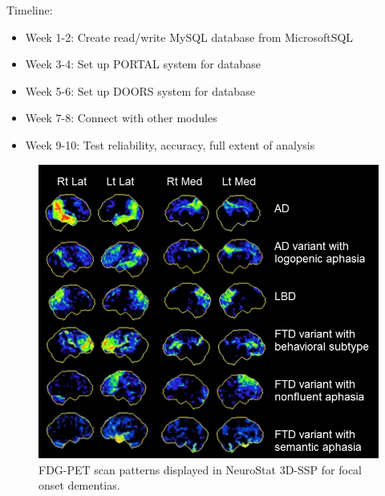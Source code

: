 \documentclass[10pt,twocolumn,twoside]{article}
\begin{document}
Timeline:
\begin{itemize}
	\item Week 1-2: Create read/write MySQL database from MicrosoftSQL
	\item Week 3-4: Set up PORTAL system for database
	\item Week 5-6: Set up DOORS system for database
	\item Week 7-8: Connect with other modules 
	\item Week 9-10: Test reliability, accuracy, full extent of analysis
\end{itemize}
	
\begin{figure}[ht]
{\centering
\includegraphics[width=6.5in]{FDGPETFOD_patterns_ctrev3.png}
\caption{FDG-PET scan patterns displayed in NeuroStat 3D-SSP for focal onset dementias.}
\label{figADPatterns} }
\end{figure}
\end{document}
